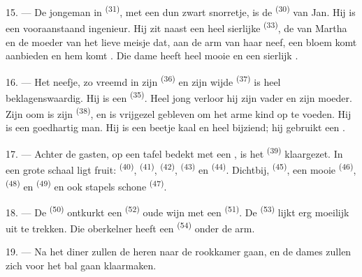 15. --- De jongeman in  \textsuperscript{(31)}, met een dun zwart snorretje, is de
 \textsuperscript{(30)} van Jan. Hij is een vooraanstaand ingenieur. Hij zit
naast een heel sierlijke  \textsuperscript{(33)}, de 
van Martha en de moeder van het lieve meisje dat, aan de arm van haar neef, een bloem komt
aanbieden en hem
 komt . Die dame heeft heel mooie
 en een sierlijk .

16. --- Het neefje, zo vreemd in zijn  \textsuperscript{(36)} en zijn wijde
 \textsuperscript{(37)} is heel beklagenswaardig. Hij is een 
\textsuperscript{(35)}. Heel jong verloor hij zijn vader en zijn moeder. Zijn oom is zijn
 \textsuperscript{(38)}, en is vrijgezel gebleven om het arme kind op te voeden.
Hij is een goedhartig man. Hij is een beetje kaal en heel bijziend; hij gebruikt een
.

\VUsaut{2.4mm}
\VUsaut{3.0mm}

17. --- Achter de gasten, op een tafel bedekt met een , is het
 \textsuperscript{(39)} klaargezet. In een grote schaal ligt fruit:
 \textsuperscript{(40)},  \textsuperscript{(41)},
 \textsuperscript{(42)},
 \textsuperscript{(43)} en 
\textsuperscript{(44)}. Dichtbij,  \textsuperscript{(45)}, een mooie
 \textsuperscript{(46)},
 \textsuperscript{(48)} en 
\textsuperscript{(49)} en ook stapels schone  \textsuperscript{(47)}.

18. --- De  \textsuperscript{(50)} ontkurkt een
 \textsuperscript{(52)} oude wijn met een 
\textsuperscript{(51)}. De  \textsuperscript{(53)} lijkt erg moeilijk uit te
trekken. Die oberkelner heeft een  \textsuperscript{(54)} onder de arm.

19. --- Na het diner zullen de heren naar de rookkamer gaan, en de dames zullen zich voor het
bal gaan klaarmaken.

\VUsaut{5.0mm}
\VUsaut{1.6mm}
\VUsaut{2.6mm}

